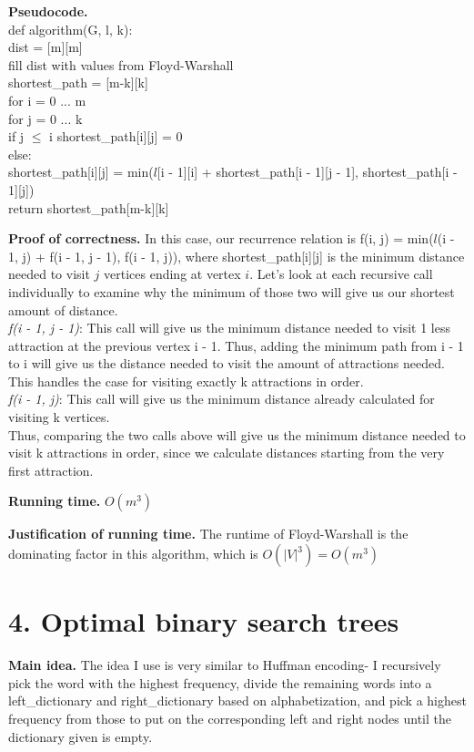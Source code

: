 \documentclass[11pt]{article}
\begin{document}
\noindent
\textbf{Pseudocode.}\\
def algorithm(G, l, k): \\
\indent dist = [m][m] \\
\indent fill dist with values from Floyd-Warshall \\
\indent shortest\_path = [m-k][k] \\
\indent for i = 0 ... m \\
\indent\indent for j = 0 ... k \\
\indent\indent\indent if j $\leq$ i shortest\_path[i][j] = 0 \\
\indent\indent\indent else:\\
\indent\indent\indent\indent shortest\_path[i][j] = min($l$[i - 1][i] + shortest\_path[i - 1][j - 1], shortest\_path[i - 1][j]) \\
\indent return shortest\_path[m-k][k]

\noindent
\textbf{Proof of correctness.}
In this case, our recurrence relation is f(i, j) = min($l$(i - 1, j) + f(i - 1, j - 1), f(i - 1, j)), where shortest\_path[i][j] is the minimum distance needed to visit $j$ vertices ending at vertex $i$.  Let's look at each recursive call individually to examine why the minimum of those two will give us our shortest amount of distance.\\
\textit{f(i - 1, j - 1)}: This call will give us the minimum distance needed to visit 1 less attraction at the previous vertex i - 1.  Thus, adding the minimum path from i - 1 to i will give us the distance needed to visit the amount of attractions needed.  This handles the case for visiting exactly k attractions in order. \\
\textit{f(i - 1, j)}: This call will give us the minimum distance already calculated for visiting k vertices. \\
Thus, comparing the two calls above will give us the minimum distance needed to visit k attractions in order, since we calculate distances starting from the very first attraction.



\noindent
\textbf{Running time.}
$O(m^3)$


\noindent
\textbf{Justification of running time.}
The runtime of Floyd-Warshall is the dominating factor in this algorithm, which is $O(|V|^3) = O(m^3)$


\newpage
\section*{4. Optimal binary search trees}
\noindent
\textbf{Main idea.}
The idea I use is very similar to Huffman encoding- I recursively pick the word with the highest frequency, divide the remaining words into a left\_dictionary and right\_dictionary based on alphabetization, and pick a highest frequency from those to put on the corresponding left and right nodes until the dictionary given is empty.
\end{document}
